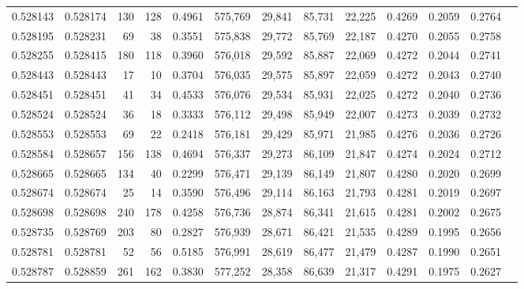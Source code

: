 \begin{tabular}{rrrrrrrrrrrrr}
0.528143 & 0.528174 &   130 &   128 &                                     0.4961 & 575,769 &  29,841 &  85,731 &  22,225 & 0.4269 & 0.2059 & 0.2764 \\
0.528195 & 0.528231 &    69 &    38 &                                     0.3551 & 575,838 &  29,772 &  85,769 &  22,187 & 0.4270 & 0.2055 & 0.2758 \\
0.528255 & 0.528415 &   180 &   118 &                                     0.3960 & 576,018 &  29,592 &  85,887 &  22,069 & 0.4272 & 0.2044 & 0.2741 \\
0.528443 & 0.528443 &    17 &    10 &                                     0.3704 & 576,035 &  29,575 &  85,897 &  22,059 & 0.4272 & 0.2043 & 0.2740 \\
0.528451 & 0.528451 &    41 &    34 &                                     0.4533 & 576,076 &  29,534 &  85,931 &  22,025 & 0.4272 & 0.2040 & 0.2736 \\
0.528524 & 0.528524 &    36 &    18 &                                     0.3333 & 576,112 &  29,498 &  85,949 &  22,007 & 0.4273 & 0.2039 & 0.2732 \\
0.528553 & 0.528553 &    69 &    22 &                                     0.2418 & 576,181 &  29,429 &  85,971 &  21,985 & 0.4276 & 0.2036 & 0.2726 \\
0.528584 & 0.528657 &   156 &   138 &                                     0.4694 & 576,337 &  29,273 &  86,109 &  21,847 & 0.4274 & 0.2024 & 0.2712 \\
0.528665 & 0.528665 &   134 &    40 &                                     0.2299 & 576,471 &  29,139 &  86,149 &  21,807 & 0.4280 & 0.2020 & 0.2699 \\
0.528674 & 0.528674 &    25 &    14 &                                     0.3590 & 576,496 &  29,114 &  86,163 &  21,793 & 0.4281 & 0.2019 & 0.2697 \\
0.528698 & 0.528698 &   240 &   178 &                                     0.4258 & 576,736 &  28,874 &  86,341 &  21,615 & 0.4281 & 0.2002 & 0.2675 \\
0.528735 & 0.528769 &   203 &    80 &                                     0.2827 & 576,939 &  28,671 &  86,421 &  21,535 & 0.4289 & 0.1995 & 0.2656 \\
0.528781 & 0.528781 &    52 &    56 &                                     0.5185 & 576,991 &  28,619 &  86,477 &  21,479 & 0.4287 & 0.1990 & 0.2651 \\
0.528787 & 0.528859 &   261 &   162 &                                     0.3830 & 577,252 &  28,358 &  86,639 &  21,317 & 0.4291 & 0.1975 & 0.2627 \\

\end{tabular}
